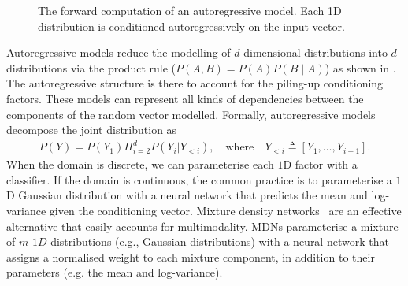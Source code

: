 \begin{figure}
\caption{The forward computation of an autoregressive model. Each 1D distribution is conditioned autoregressively on the input vector.} \label{fig:AM}
\end{figure}
Autoregressive models reduce the modelling of $d$-dimensional distributions into $d$ distributions via the product rule ($P(A, B) = P(A) P(B\mid A)$) as shown in . The autoregressive structure is there to account for the piling-up conditioning factors. These models can represent all kinds of dependencies between the components of the random vector modelled.
Formally, autoregressive models decompose the joint distribution as
\begin{align}
  P(Y) = P(Y_1) \Pi^d_{i=2} P(Y_i|Y_{<i}), \quad \text{where} \quad Y_{<i} \triangleq \left[ Y_1, \dots, Y_{i-1}\right].
\end{align}
When the domain is discrete, we can parameterise each $1$D factor with a classifier. If the domain is continuous, the common practice is to parameterise a $1$D Gaussian distribution with a neural network that predicts the mean and log-variance given the conditioning vector. Mixture density networks~\citep[][MDNs]{bishop1994mixture} are an effective alternative that easily accounts for multimodality. MDNs parameterise a mixture of $m$ $1D$ distributions (e.g., Gaussian distributions) with a neural network that assigns a normalised weight to each mixture component, in addition to their parameters (e.g. the mean and log-variance).
